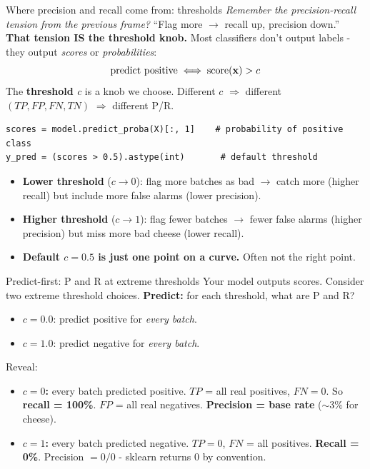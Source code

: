 \documentclass[aspectratio=169]{beamer}
\begin{document}
\begin{frame}[fragile]{Where precision and recall come from: thresholds}
  \emph{Remember the precision-recall tension from the previous frame?} ``Flag more $\to$ recall up, precision down.'' \textbf{That tension IS the threshold knob.}
  \vfill
  Most classifiers don't output labels - they output \emph{scores} or \emph{probabilities}:
  \[
    \text{predict positive} \iff \text{score}(\mathbf{x}) > c
  \]
  The \textbf{threshold $c$} is a knob we choose. Different $c$ $\Rightarrow$ different $(TP, FP, FN, TN)$ $\Rightarrow$ different P/R.
  \vfill
{\lstset{basicstyle=\ttfamily\scriptsize}
\begin{lstlisting}
scores = model.predict_proba(X)[:, 1]    # probability of positive class
y_pred = (scores > 0.5).astype(int)       # default threshold
\end{lstlisting}}
  \vfill
  \begin{itemize}\small
    \item \textbf{Lower threshold} ($c \to 0$): flag more batches as bad $\to$ catch more (higher recall) but include more false alarms (lower precision).
    \item \textbf{Higher threshold} ($c \to 1$): flag fewer batches $\to$ fewer false alarms (higher precision) but miss more bad cheese (lower recall).
    \item \textbf{Default $c = 0.5$ is just one point on a curve.} Often not the right point.
  \end{itemize}
\end{frame}

\begin{frame}{Predict-first: P and R at extreme thresholds}
  Your model outputs scores. Consider two extreme threshold choices.
  \vfill
  \textbf{Predict:} for each threshold, what are P and R?
  \begin{itemize}
    \item $c = 0.0$: predict positive for \emph{every batch}.
    \item $c = 1.0$: predict negative for \emph{every batch}.
  \end{itemize}
  \vfill
  Reveal:
  \begin{itemize}\small
    \item \textbf{$c = 0$:} every batch predicted positive. $TP$ = all real positives, $FN = 0$. So \textbf{recall = 100\%}. $FP$ = all real negatives. \textbf{Precision = base rate} ($\sim 3\%$ for cheese).
    \item \textbf{$c = 1$:} every batch predicted negative. $TP = 0$, $FN$ = all positives. \textbf{Recall = 0\%}. Precision $= 0 / 0$ - sklearn returns $0$ by convention.
  \end{itemize}
  \vfill
\end{frame}
\end{document}
